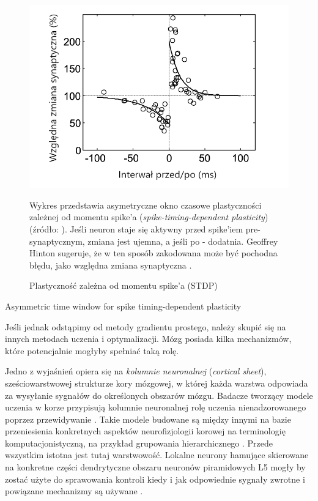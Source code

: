 \begin{figure}[!ht]
	\includegraphics[width=\textwidth]{Images/SpikeTimingDependentPlasticity}
	\caption{Plastyczność zależna od momentu spike'a (STDP)}
	Wykres przedstawia asymetryczne okno czasowe plastyczności zależnej od momentu spike'a (\emph{spike-timing-dependent plasticity}) (źródło: \cite{yao2005synaptic}).
	Jeśli neuron staje się aktywny przed spike'iem pre-synaptycznym, zmiana jest ujemna, a jeśli po - dodatnia.
	Geoffrey Hinton sugeruje, że w ten sposób zakodowana może być pochodna błędu, jako względna zmiana synaptyczna \cite{hinton2016can}.
	\label{fig:spike-timing-dependent-plasticity}
\end{figure}

Asymmetric time window for spike timing-dependent plasticity

Jeśli jednak odstąpimy od metody gradientu prostego, należy skupić się na innych metodach uczenia i optymalizacji.
Mózg posiada kilka mechanizmów, które potencjalnie mogłyby spełniać taką rolę.

Jedno z wyjaśnień opiera się na \emph{kolumnie neuronalnej} (\emph{cortical sheet}), sześciowarstwowej strukturze kory mózgowej, w której każda warstwa odpowiada za wysyłanie sygnałów do określonych obszarów mózgu.
Badacze tworzący modele uczenia w korze przypisują kolumnie neuronalnej rolę uczenia nienadzorowanego poprzez przewidywanie \cite{o2014learning}.
Takie modele budowane są między innymi na bazie przeniesienia konkretnych aspektów neurofizjologii korowej na terminologię komputacjonistyczną, na przykład grupowania hierarchicznego \cite{rodriguez2004derivation}.
Przede wszystkim istotna jest tutaj warstwowość.
Lokalne neurony hamujące skierowane na konkretne części dendrytyczne obszaru neuronów piramidowych L5 mogły by zostać użyte do sprawowania kontroli kiedy i jak odpowiednie sygnały zwrotne i powiązane mechanizmy są używane \cite{marblestone2016toward}.

